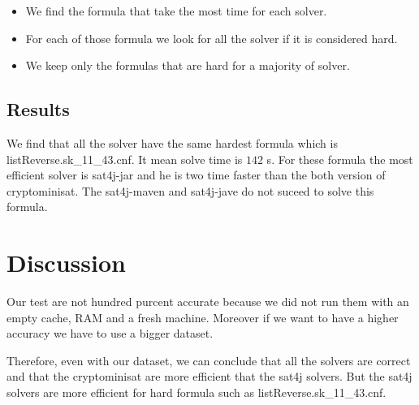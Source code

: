 \documentclass{article}
\begin{document}
\vskip 3mm

\begin{itemize}
\item We find the formula that take the most time for each solver.
\item For each of those formula we look for all the solver if it is considered hard.
\item We keep only the formulas that are hard for a majority of solver. 
\end{itemize}
\subsection{Results}

We find that all the solver have the same hardest formula which is listReverse.sk\_11\_43.cnf. It mean solve time is $142 $ s. 
For these formula the most efficient solver is sat4j-jar and he is two time faster than the both version of cryptominisat. The sat4j-maven and sat4j-jave do not suceed to solve this formula. 


\section{Discussion}
Our test are not hundred purcent accurate because we did not run them with an empty cache, RAM and a fresh machine. Moreover if we want to have a higher accuracy we have to use a bigger dataset.

Therefore, even with our dataset, we can conclude that all the solvers are correct and that the cryptominisat are more efficient that the sat4j solvers. But the sat4j solvers are more efficient for hard formula such as listReverse.sk\_11\_43.cnf.
\end{document}
